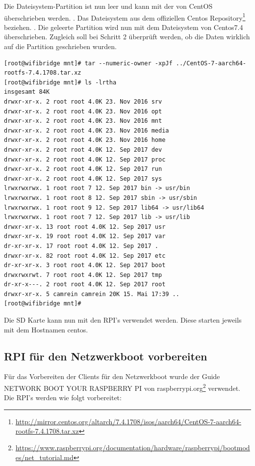 Die Dateisystem-Partition ist nun leer und kann mit der von CentOS überschrieben werden. . Das Dateisystem aus dem offiziellen Centos Repository\footnote{\url{http://mirror.centos.org/altarch/7.4.1708/isos/aarch64/CentOS-7-aarch64-rootfs-7.4.1708.tar.xz}} beziehen. . Die geleerte Partition wird nun mit dem Dateisystem von Centos7.4 überschrieben. Zugleich soll bei Schritt 2 überprüft werden, ob die Daten wirklich auf die Partition geschrieben wurden.
\begin{lstlisting}
[root@wifibridge mnt]# tar --numeric-owner -xpJf ../CentOS-7-aarch64-rootfs-7.4.1708.tar.xz
[root@wifibridge mnt]# ls -lrtha
insgesamt 84K
drwxr-xr-x. 2 root root 4.0K 23. Nov 2016 srv
drwxr-xr-x. 2 root root 4.0K 23. Nov 2016 opt
drwxr-xr-x. 2 root root 4.0K 23. Nov 2016 mnt
drwxr-xr-x. 2 root root 4.0K 23. Nov 2016 media
drwxr-xr-x. 2 root root 4.0K 23. Nov 2016 home
drwxr-xr-x. 2 root root 4.0K 12. Sep 2017 dev
drwxr-xr-x. 2 root root 4.0K 12. Sep 2017 proc
drwxr-xr-x. 2 root root 4.0K 12. Sep 2017 run
drwxr-xr-x. 2 root root 4.0K 12. Sep 2017 sys
lrwxrwxrwx. 1 root root 7 12. Sep 2017 bin -> usr/bin
lrwxrwxrwx. 1 root root 8 12. Sep 2017 sbin -> usr/sbin
lrwxrwxrwx. 1 root root 9 12. Sep 2017 lib64 -> usr/lib64
lrwxrwxrwx. 1 root root 7 12. Sep 2017 lib -> usr/lib
drwxr-xr-x. 13 root root 4.0K 12. Sep 2017 usr
drwxr-xr-x. 19 root root 4.0K 12. Sep 2017 var
dr-xr-xr-x. 17 root root 4.0K 12. Sep 2017 .
drwxr-xr-x. 82 root root 4.0K 12. Sep 2017 etc
dr-xr-xr-x. 3 root root 4.0K 12. Sep 2017 boot
drwxrwxrwt. 7 root root 4.0K 12. Sep 2017 tmp
dr-xr-x---. 2 root root 4.0K 12. Sep 2017 root
drwxr-xr-x. 5 camrein camrein 20K 15. Mai 17:39 ..
[root@wifibridge mnt]#
\end{lstlisting}

Die SD Karte kann nun mit den RPI's verwendet werden. Diese starten jeweils mit dem Hostnamen centos.


\subsection{RPI für den Netzwerkboot vorbereiten}
Für das Vorbereiten der Clients für den Netzwerkboot wurde der Guide NETWORK BOOT YOUR RASPBERRY PI von raspberrypi.org\footnote{\url{https://www.raspberrypi.org/documentation/hardware/raspberrypi/bootmodes/net\_tutorial.md}} verwendet. Die RPI's werden wie folgt vorbereitet:

